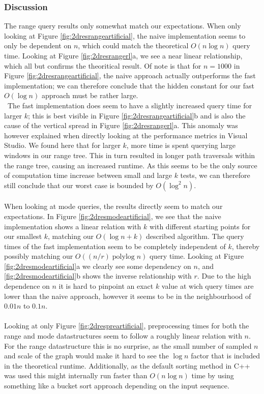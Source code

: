\documentclass{article}
\newcommand{\fb}[1]{{\color{blue}#1}}
\DeclareMathOperator{\polylog}{polylog}
\begin{document}
\subsubsection*{Discussion}
\fb{The range query results only somewhat match our expectations. When only looking at Figure \ref{fig:2dresrangeartificial}, the naive implementation seems to only be dependent on $n$, which could match the theoretical $O(n \log n)$ query time. Looking at Figure \ref{fig:2dresrangerl}a, we see a near linear relationship, which all but confirms the theoritical result. Of note is that for $n=1000$ in Figure \ref{fig:2dresrangeartificial}, the naive approach actually outperforms the fast implementation; we can therefore conclude that the hidden constant for our fast $O(\log n)$ approach must be rather large. \\\
The fast implementation does seem to have a slightly increased query time for larger $k$; this is best visible in Figure \ref{fig:2dresrangeartificial}b and is also the cause of the vertical spread in Figure \ref{fig:2dresrangerl}a. This anomaly was however explained when directly looking at the performance metrics in Visual Studio. We found here that for larger $k$, more time is spent querying large windows in our range tree. This in turn resulted in longer path traversals within the range tree, causing an increased runtime. As this seems to be the only source of computation time increase between small and large $k$ tests, we can therefore still conclude that our worst case is bounded by $O(\log^2 n)$. \\\\
When looking at mode queries, the results directly seem to match our expectations. In Figure \ref{fig:2dresmodeartificial}, we see that the naive implementation shows a linear relation with $k$ with different starting points for our smallest $k$, matching our $O(\log n + k)$ described algorithm. The query times of the fast implementation seem to be completely independent of $k$, thereby possibly matching our $O((n/r) \polylog n)$ query time. Looking at Figure \ref{fig:2dresmodeartificial}a we clearly see some dependency on $n$, and \ref{fig:2dresmodeartificial}b shows the inverse relationship with $r$. Due to the high dependence on $n$ it is hard to pinpoint an exact $k$ value at wich query times are lower than the naive approach, however it seems to be in the neighbourhood of $0.01n$ to $0.1n$.\\\\
Looking at only Figure \ref{fig:2drespreartificial}, preprocessing times for both the range and mode datastructures seem to follow a roughly linear relation with $n$. For the range datastructure this is no surprise, as the small number of sampled $n$ and scale of the graph would make it hard to see the $\log n$ factor that is included in the theoretical runtime. Additionally, as the default sorting method in C++ was used this might internally run faster than $O(n \log n)$ time by using something like a bucket sort approach depending on the input sequence. \\
}
\end{document}

